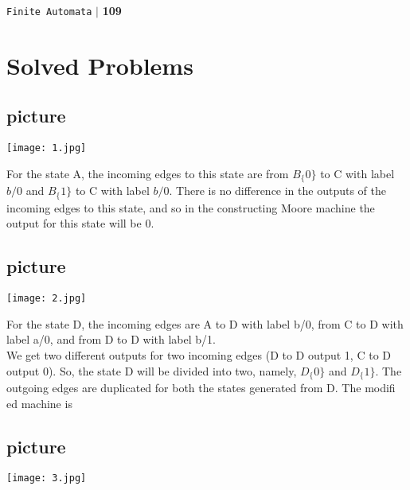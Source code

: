 \documentclass[9pt]{beamer}
\begin{document}
\begin{frame}

\begin{flushright}
 \texttt{Finite Automata} \hspace*{0.10cm}\textbf{$|$} \textbf{109}\hspace*{0.5cm}
\end{flushright}

\section*{Solved Problems}
\begin{center}
\section{picture}
\texttt{[image: 1.jpg]}
\end{center}
For the state A, the incoming edges to this state are from $B_\{0\}$ to C with label $b/0$ and $B_\{1\}$ to C with label $b/0$. There is no difference in the outputs of the incoming edges to this state, and so in the constructing Moore machine the output for this state will be 0.\\
\end{frame}

\begin{frame}
\begin{center}
\section{picture}
\texttt{[image: 2.jpg]}
\end{center}
\end{frame}

\begin{frame}
For the state D, the incoming edges are A to D with label b/0, from C to D with label a/0, and from D to D with label b/1.\\
We get two different outputs for two incoming edges (D to D output 1, C to D output 0). So, the state D will be divided into two, namely, $D_\{0\}$ and $D_\{1\}$. The outgoing edges are duplicated for both the states generated from D. The modiﬁ ed machine is
\begin{center}
\section{picture}
\texttt{[image: 3.jpg]}
\end{center}
\end{frame}
\end{document}
